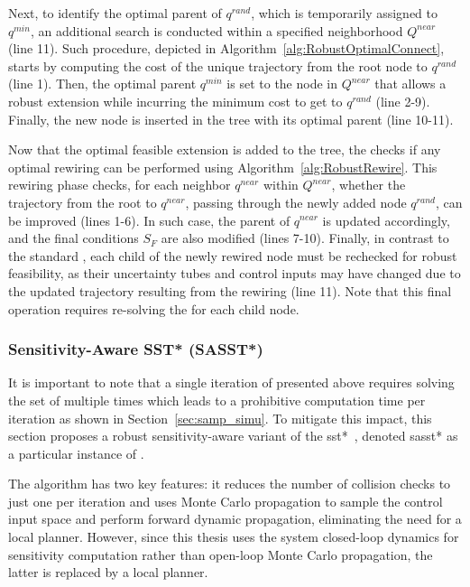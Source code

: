 Next, to identify the optimal parent of $q^{rand}$, which is temporarily assigned to $q^{min}$, an additional search is conducted within a specified neighborhood $Q^{near}$ (line 11).
Such procedure, depicted in Algorithm~\ref{alg:RobustOptimalConnect}, starts by computing the cost of the unique trajectory from the root node to $q^{rand}$ (line 1).
Then, the optimal parent $q^{min}$ is set to the node in $Q^{near}$ that allows a robust extension while incurring the minimum cost to get to $q^{rand}$ (line 2-9).
Finally, the new node is inserted in the tree with its optimal parent (line 10-11).

Now that the optimal feasible extension is added to the tree, the  checks if any optimal rewiring can be performed using Algorithm~\ref{alg:RobustRewire}.
This rewiring phase checks, for each neighbor $q^{near}$ within $Q^{near}$, whether the trajectory from the root to $q^{near}$, passing through the newly added node $q^{rand}$, can be improved (lines 1-6).
In such case, the parent of $q^{near}$ is updated accordingly, and the final  conditions $S_F$ are also modified (lines 7-10).
Finally, in contrast to the standard , each child of the newly rewired node must be rechecked for robust feasibility, as their uncertainty tubes and control inputs may have changed due to the updated trajectory resulting from the rewiring (line 11).
Note that this final operation requires re-solving the  for each child node.

\subsubsection{Sensitivity-Aware SST* (SASST*)}

It is important to note that a single iteration of  presented above requires solving the set of  multiple times which leads to a prohibitive computation time per iteration as shown in Section~\ref{sec:samp_simu}.
To mitigate this impact, this section proposes a robust sensitivity-aware variant of the \gls{sst*}~\cite{cSST}, denoted \gls{sasst*} as a particular instance of . 

The  algorithm has two key features: it reduces the number of collision checks to just one per iteration and uses Monte Carlo propagation to sample the control input space and perform forward dynamic propagation, eliminating the need for a local planner.
However, since this thesis uses the system closed-loop dynamics for sensitivity computation rather than open-loop Monte Carlo propagation, the latter is replaced by a local planner.

